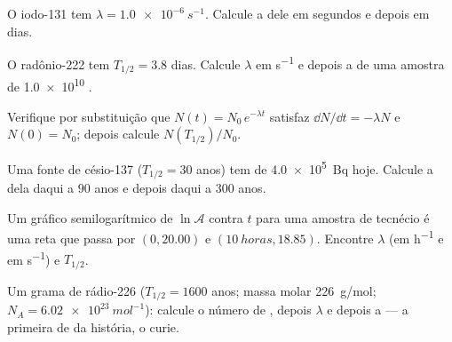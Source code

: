 \begin{exercise}[$\star$]\label{exo:g12:radioactive-decay:1}
O iodo-131 tem $\lambda = \qty{1.0e-6}{s^{-1}}$. Calcule a  dele em segundos e
depois em dias.
\end{exercise}

\begin{exercise}[$\star$]\label{exo:g12:radioactive-decay:2}
O radônio-222 tem $T_{1/2} = 3.8$ dias. Calcule $\lambda$ em \unit{s^{-1}} e depois a
 de uma amostra de \num{1.0e10} .
\end{exercise}

\begin{exercise}[$\star$]\label{exo:g12:radioactive-decay:3}
Verifique por substituição que $N(t) = N_0\,e^{-\lambda t}$ satisfaz
$\dd N/\dd t = -\lambda N$ e $N(0) = N_0$; depois calcule $N(T_{1/2})/N_0$.
\end{exercise}

\begin{exercise}[$\star$]\label{exo:g12:radioactive-decay:4}
Uma fonte de césio-137 ($T_{1/2} = 30$ anos) tem  de \qty{4.0e5}{Bq} hoje.
Calcule a  dela daqui a $90$ anos e depois daqui a $300$ anos.
\end{exercise}

\begin{exercise}[$\star$]\label{exo:g12:radioactive-decay:5}
Um gráfico semilogarítmico de $\ln \mathcal A$ contra $t$ para uma amostra de tecnécio é
uma reta que passa por $(0, 20.00)$ e $(\qty{10}{horas}, 18.85)$. Encontre $\lambda$ (em
\unit{h^{-1}} e em \unit{s^{-1}}) e $T_{1/2}$.
\end{exercise}

\begin{exercise}[$\star\star$]\label{exo:g12:radioactive-decay:6}
Um grama de rádio-226 ($T_{1/2} = 1600$ anos; massa molar \qty{226}{g/mol};
$N_A = \qty{6.02e23}{mol^{-1}}$): calcule o número de , depois $\lambda$ e depois
a  --- a primeira  de  da história, o curie.
\end{exercise}

